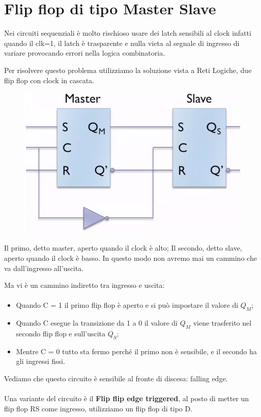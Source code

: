 \newpage
\section{Flip flop di tipo Master Slave}

Nei circuiti sequenziali è molto rischioso usare dei latch sensibili al clock infatti quando il clk=1, il latch è trasparente e nulla vieta al segnale di ingresso di variare provocando errori nella logica combinatoria.

Per risolvere questo problema utilizziamo la soluzione vista a Reti Logiche, due flip flop con clock in cascata.

\begin{figure}[htbp]
    \centering
    \includegraphics[width=0.5\linewidth]{img/master_slave.png}
\end{figure}

Il primo, detto master, aperto quando il clock è alto; Il secondo, detto slave, aperto quando il clock è basso.
In questo modo non avremo mai un cammino che va dall'ingresso all'uscita.

Ma vi è un cammino indiretto tra ingresso e uscita:
\paragraph{}
\begin{itemize}
    \item[] Quando C = 1 il primo flip flop è aperto e si può impostare il valore di $Q_M$;
    \item[] Quando C esegue la transizione da 1 a 0 il valore di $Q_M$ viene trasferito nel secondo flip flop e sull'uscita $Q_S$;
    \item[] Mentre C = 0 tutto sta fermo perché il primo non è sensibile, e il secondo ha gli ingressi fissi.
\end{itemize}

Vediamo che questo circuito è sensibile al fronte di discesa: falling edge.

\paragraph{}
Una variante del circuito è il \textbf{Flip flip edge triggered}, al posto di metter un flip flop RS come ingresso, utilizziamo un flip flop di tipo D.

